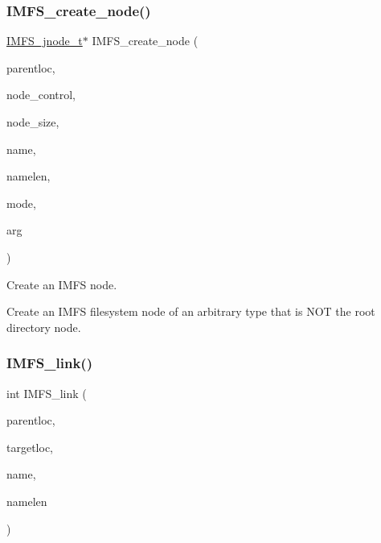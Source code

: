 \subsubsection{\texorpdfstring{IMFS\_create\_node()}{IMFS\_create\_node()}}
{\footnotesize\ttfamily \mbox{\hyperlink{structIMFS__jnode__tt}{I\+M\+F\+S\+\_\+jnode\+\_\+t}}$\ast$ I\+M\+F\+S\+\_\+create\+\_\+node (\begin{DoxyParamCaption}\item[{const \mbox{\hyperlink{group__LibIO_ga3252b3d31ee3c49ffff0b7604a676864}{rtems\+\_\+filesystem\+\_\+location\+\_\+info\+\_\+t}} $\ast$}]{parentloc,  }\item[{const \mbox{\hyperlink{structIMFS__node__control}{I\+M\+F\+S\+\_\+node\+\_\+control}} $\ast$}]{node\+\_\+control,  }\item[{size\+\_\+t}]{node\+\_\+size,  }\item[{const char $\ast$}]{name,  }\item[{size\+\_\+t}]{namelen,  }\item[{mode\+\_\+t}]{mode,  }\item[{void $\ast$}]{arg }\end{DoxyParamCaption})}



Create an I\+M\+FS node. 

Create an I\+M\+FS filesystem node of an arbitrary type that is N\+OT the root directory node. \mbox{\label{group__IMFS_ga201e8fee9c1188bd9ded438a4a649a4e}} 
\subsubsection{\texorpdfstring{IMFS\_link()}{IMFS\_link()}}
{\footnotesize\ttfamily int I\+M\+F\+S\+\_\+link (\begin{DoxyParamCaption}\item[{const \mbox{\hyperlink{group__LibIO_ga3252b3d31ee3c49ffff0b7604a676864}{rtems\+\_\+filesystem\+\_\+location\+\_\+info\+\_\+t}} $\ast$}]{parentloc,  }\item[{const \mbox{\hyperlink{group__LibIO_ga3252b3d31ee3c49ffff0b7604a676864}{rtems\+\_\+filesystem\+\_\+location\+\_\+info\+\_\+t}} $\ast$}]{targetloc,  }\item[{const char $\ast$}]{name,  }\item[{size\+\_\+t}]{namelen }\end{DoxyParamCaption})}



